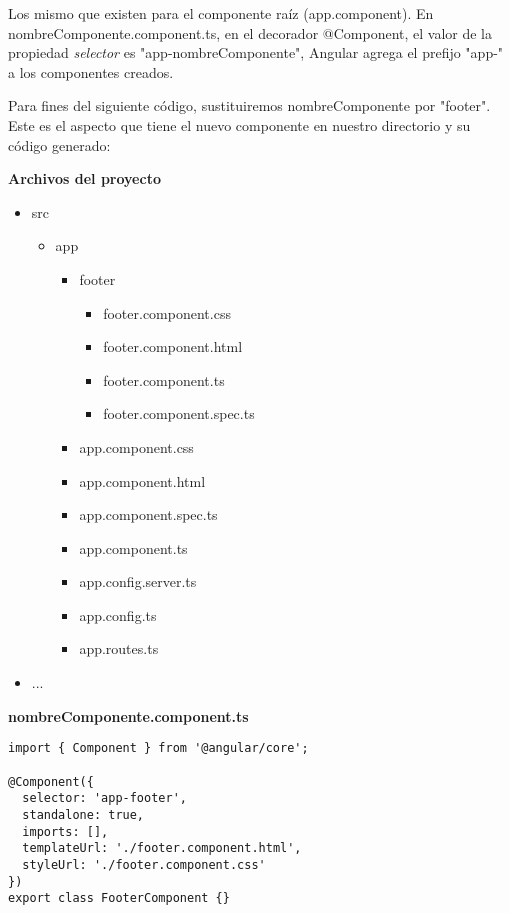 Los mismo que existen para el componente raíz (app.component). En nombreComponente.component.ts, en el decorador @Component, el valor de la propiedad \textit{selector} es "app-nombreComponente", Angular agrega el prefijo "app-" a los componentes creados.

Para fines del siguiente código, sustituiremos nombreComponente por "footer". Este es el aspecto que tiene el nuevo componente en nuestro directorio y su código generado:

\textbf{Archivos del proyecto}
\begin{itemize}
    \item src
    \begin{itemize}
        \item app
        \begin{itemize}
            \item footer
            \begin{itemize}
                \item footer.component.css
                \item footer.component.html
                \item footer.component.ts
                \item footer.component.spec.ts
            \end{itemize}
            \item app.component.css
            \item app.component.html
            \item app.component.spec.ts
            \item app.component.ts
            \item app.config.server.ts
            \item app.config.ts
            \item app.routes.ts
        \end{itemize}
    \end{itemize}
    \item ...
\end{itemize}

\textbf{nombreComponente.component.ts}
\begin{lstlisting}[style=htmlcssjs]
import { Component } from '@angular/core';

@Component({
  selector: 'app-footer',
  standalone: true,
  imports: [],
  templateUrl: './footer.component.html',
  styleUrl: './footer.component.css'
})
export class FooterComponent {}
\end{lstlisting}

